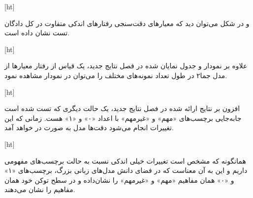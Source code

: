 [ht]

و در شکل  می‌توان دید که معیارهای دقت‌سنجی رفتارهای اندکی متفاوت در کل دادگان تست نشان داده است.


[ht]

علاوه بر نمودار و جدول نمایان شده در فصل نتایج جدید، یک قیاس از رفتار معیارها از مدل جما۲ در طول تعداد نمونه‌های مختلف را می‌توان در نمودار  مشاهده نمود.

[ht]

افزون بر نتایج ارائه شده در فصل نتایج جدید، یک حالت دیگری که تست شده است جابه‌جایی برچسب‌های «مهم» و «غیرمهم» با اعداد «۰» و «۱» هست. زمانی که این تغییرات انجام می‌شود دقت‌ها مدل به صورت  در خواهد آمد.

[ht]

همانگونه که مشخص است تغییرات خیلی اندکی نسبت به حالت برچسب‌های مفهومی داریم و این به آن معناست که در فضای دانش مدل‌های زبانی بزرگ، برچسب‌های «۱» و «۰» همان مفاهیم «مهم» و «غیرمهم» را نشان‌داده و در سطح توکن خود همان مفاهیم را نشان‌ می‌دهند.